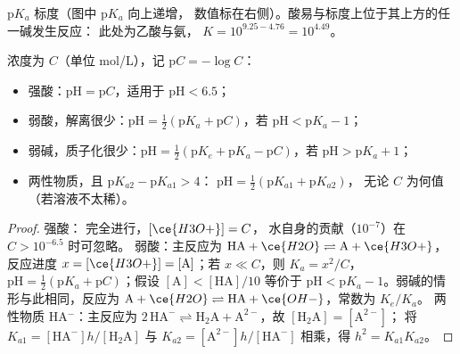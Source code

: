 \begin{omfigure}

{\small $\mathrm{p}K_a$ 标度（图中 p$K_a$ 向上递增，
数值标在右侧）。酸易与标度上位于其上方的任一碱发生反应：
此处为乙酸与氨，
$K = 10^{9.25 - 4.76} = 10^{4.49}$。}
\end{omfigure}

\begin{proposition}[简单溶液的 pH]\label{prop:b1:predominant-reaction:ph-formulas}
浓度为 $C$（单位 \unit{mol/L}），记 $\mathrm{p}C = -\log C$：
\begin{itemize}
  \item 强酸：$\mathrm{pH} = \mathrm{p}C$，适用于
        $\mathrm{pH} < 6.5$；
  \item 弱酸，解离很少：$\mathrm{pH} = \frac12(\mathrm{p}K_a
        + \mathrm{p}C)$，若 $\mathrm{pH} < \mathrm{p}K_a - 1$；
  \item 弱碱，质子化很少：$\mathrm{pH} = \frac12(\mathrm{p}K_e +
        \mathrm{p}K_a - \mathrm{p}C)$，若 $\mathrm{pH} > \mathrm{p}K_a +
        1$；
  \item 两性物质，且 $\mathrm{p}K_{a2} - \mathrm{p}K_{a1} > 4$：
        $\mathrm{pH} = \frac12(\mathrm{p}K_{a1} + \mathrm{p}K_{a2})$，
        无论 $C$ 为何值（若溶液不太稀）。
\end{itemize}
\end{proposition}

\begin{proof}
强酸： 完全进行，$[\ce{H3O+}] = C$，
水自身的贡献（$10^{-7}$）在 $C > 10^{-6.5}$ 时可忽略。
弱酸：主反应为 $\mathrm{HA} + \ce{H2O}
\rightleftharpoons \mathrm{A} + \ce{H3O+}$，反应进度 $x = [\ce{H3O+}]
= [\mathrm{A}]$；若 $x \ll C$，则 $K_a = x^2/C$，$\mathrm{pH} = \frac12(\mathrm{p}K_a
+ \mathrm{p}C)$；假设 $[\mathrm{A}] < [\mathrm{HA}]/10$
等价于 $\mathrm{pH} < \mathrm{p}K_a - 1$。弱碱的情形与此相同，反应为 $\mathrm{A} +
\ce{H2O} \rightleftharpoons \mathrm{HA} + \ce{OH-}$，常数为 $K_e/K_a$。
两性物质 HA$^-$：主反应为 $2\,\mathrm{HA}^- \rightleftharpoons
\mathrm{H_2A} + \mathrm{A}^{2-}$，故 $[\mathrm{H_2A}] = [\mathrm{A}^{2-}]$；
将 $K_{a1} = [\mathrm{HA}^-]h/[\mathrm{H_2A}]$ 与 $K_{a2} =
[\mathrm{A}^{2-}]h/[\mathrm{HA}^-]$ 相乘，得 $h^2 = K_{a1}K_{a2}$。
\end{proof}

